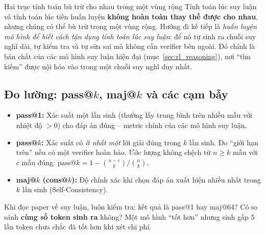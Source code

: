 \begin{center}
\label{fig:ttc_vs_pretrain}
\end{center}

\begin{assess}{Hai trục tính toán bù trừ cho nhau trong một vùng rộng}
Tính toán lúc suy luận và tính toán lúc tiền huấn luyện \textbf{không hoàn toàn thay thế được cho nhau}, nhưng chúng có thể bù trừ trong một vùng rộng. Hướng đi kế tiếp là \emph{huấn luyện mô hình để biết cách tận dụng tính toán lúc suy luận}: để nó tự sinh ra chuỗi suy nghĩ dài, tự kiểm tra và tự sửa sai mà không cần verifier bên ngoài. Đó chính là bản chất của các mô hình suy luận hiện đại (mục~\ref{sec:rl_reasoning}), nơi “tìm kiếm” được nội hóa vào trong một chuỗi suy nghĩ duy nhất.
\end{assess}

\subsection{Đo lường: pass@$k$, maj@$k$ và các cạm bẫy}
\label{ssec:passk}
\begin{itemize}
	\item \textbf{pass@1:} Xác suất một lần sinh (thường lấy trung bình trên nhiều mẫu với nhiệt độ $>0$) cho đáp án đúng -- metric chính của các mô hình suy luận.
	\item \textbf{pass@$k$:} Xác suất có \emph{ít nhất một} lời giải đúng trong $k$ lần sinh. Đo “giới hạn trên” nếu có một verifier hoàn hảo. Ước lượng không chệch từ $n \geq k$ mẫu với $c$ mẫu đúng: $\text{pass@}k = 1 - \binom{n-c}{k}\big/\binom{n}{k}$.
	\item \textbf{maj@$k$ (cons@$k$):} Độ chính xác khi chọn đáp án xuất hiện nhiều nhất trong $k$ lần sinh (Self-Consistency).
\end{itemize}
Khi đọc paper về suy luận, luôn kiểm tra: kết quả là pass@1 hay maj@64? Có so sánh \textbf{cùng số token sinh ra} không? Một mô hình “tốt hơn” nhưng sinh gấp 5 lần token chưa chắc đã tốt hơn khi xét chi phí.
